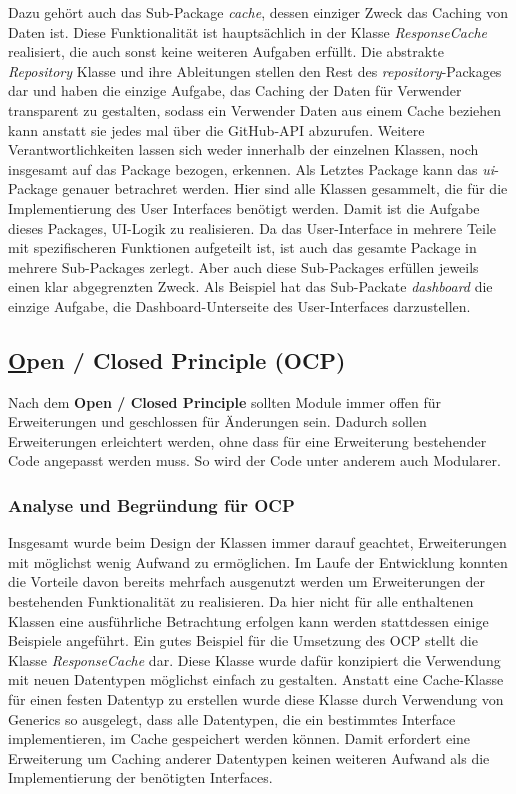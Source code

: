 Dazu gehört auch das Sub-Package \textit{cache}, dessen einziger Zweck das Caching von Daten ist.
Diese Funktionalität ist hauptsächlich in der Klasse \textit{ResponseCache} realisiert, die auch sonst keine weiteren Aufgaben erfüllt.
Die abstrakte \textit{Repository} Klasse und ihre Ableitungen stellen den Rest des \textit{repository}-Packages dar und haben die einzige Aufgabe, das Caching der Daten für Verwender transparent zu gestalten, sodass ein Verwender Daten aus einem Cache beziehen kann anstatt sie jedes mal über die GitHub-API abzurufen.
Weitere Verantwortlichkeiten lassen sich weder innerhalb der einzelnen Klassen, noch insgesamt auf das Package bezogen, erkennen.
\newline
Als Letztes Package kann das \textit{ui}-Package genauer betrachret werden.
Hier sind alle Klassen gesammelt, die für die Implementierung des User Interfaces benötigt werden.
Damit ist die Aufgabe dieses Packages, UI-Logik zu realisieren.
Da das User-Interface in mehrere Teile mit spezifischeren Funktionen aufgeteilt ist, ist auch das gesamte Package in mehrere Sub-Packages zerlegt.
Aber auch diese Sub-Packages erfüllen jeweils einen klar abgegrenzten Zweck.
Als Beispiel hat das Sub-Packate \textit{dashboard} die einzige Aufgabe, die Dashboard-Unterseite des User-Interfaces darzustellen.


\newpage
\subsection{\underline{O}pen / Closed Principle (OCP)}

Nach dem \textbf{Open / Closed Principle} sollten Module immer offen für Erweiterungen und geschlossen für Änderungen sein.
Dadurch sollen Erweiterungen erleichtert werden, ohne dass für eine Erweiterung bestehender Code angepasst werden muss.
So wird der Code unter anderem auch Modularer.

\subsubsection{Analyse und Begründung für OCP}
Insgesamt wurde beim Design der Klassen immer darauf geachtet, Erweiterungen mit möglichst wenig Aufwand zu ermöglichen.
Im Laufe der Entwicklung konnten die Vorteile davon bereits mehrfach ausgenutzt werden um Erweiterungen der bestehenden Funktionalität zu realisieren.
Da hier nicht für alle enthaltenen Klassen eine ausführliche Betrachtung erfolgen kann werden stattdessen einige Beispiele angeführt.
\newline
Ein gutes Beispiel für die Umsetzung des OCP stellt die Klasse \textit{ResponseCache} dar. 
Diese Klasse wurde dafür konzipiert die Verwendung mit neuen Datentypen möglichst einfach zu gestalten.
Anstatt eine Cache-Klasse für einen festen Datentyp zu erstellen wurde diese Klasse durch Verwendung von Generics so ausgelegt, dass alle Datentypen, die ein bestimmtes Interface implementieren, im Cache gespeichert werden können.
Damit erfordert eine Erweiterung um Caching anderer Datentypen keinen weiteren Aufwand als die Implementierung der benötigten Interfaces.
\newline



